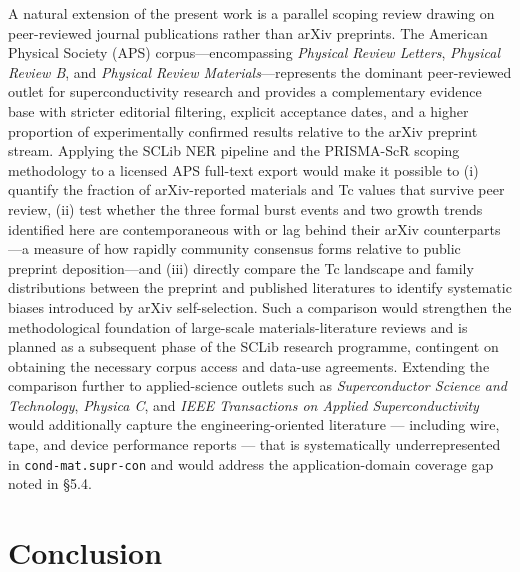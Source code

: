 \documentclass[11pt]{article}
\begin{document}
A natural extension of the present work is a parallel scoping review drawing on peer-reviewed journal publications rather than arXiv preprints. The American Physical Society (APS) corpus---encompassing \emph{Physical Review Letters}, \emph{Physical Review B}, and \emph{Physical Review Materials}---represents the dominant peer-reviewed outlet for superconductivity research and provides a complementary evidence base with stricter editorial filtering, explicit acceptance dates, and a higher proportion of experimentally confirmed results relative to the arXiv preprint stream. Applying the SCLib NER pipeline and the PRISMA-ScR scoping methodology to a licensed APS full-text export would make it possible to (i) quantify the fraction of arXiv-reported materials and Tc values that survive peer review, (ii) test whether the three formal burst events and two growth trends identified here are contemporaneous with or lag behind their arXiv counterparts---a measure of how rapidly community consensus forms relative to public preprint deposition---and (iii) directly compare the Tc landscape and family distributions between the preprint and published literatures to identify systematic biases introduced by arXiv self-selection. Such a comparison would strengthen the methodological foundation of large-scale materials-literature reviews and is planned as a subsequent phase of the SCLib research programme, contingent on obtaining the necessary corpus access and data-use agreements. Extending the comparison further to applied-science outlets such as \emph{Superconductor Science and Technology}, \emph{Physica C}, and \emph{IEEE Transactions on Applied Superconductivity} would additionally capture the engineering-oriented literature --- including wire, tape, and device performance reports --- that is systematically underrepresented in \texttt{cond-mat.supr-con} and would address the application-domain coverage gap noted in \S5.4.

\section{Conclusion}
\end{document}
